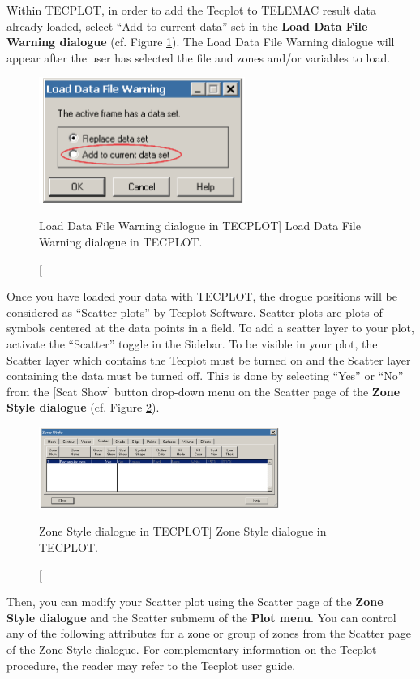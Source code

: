 Within TECPLOT, in order to add the Tecplot  to TELEMAC
result data already loaded, select ``Add to current data'' set in the
\textbf{Load Data File Warning dialogue} (cf. Figure \ref{fig:load_data}). The
Load Data File Warning dialogue will appear after the user has selected the
file and zones and/or variables to load.

\begin{figure}[H]%
\begin{center}
%
  \includegraphics[width=0.6\textwidth]{./graphics/load_data}
%
\end{center}
\caption
[Load Data File Warning dialogue in TECPLOT]
{Load Data File Warning dialogue in TECPLOT.}
\label{fig:load_data}
\end{figure}

Once you have loaded your data with TECPLOT, the drogue positions will be
considered as ``Scatter plots'' by Tecplot Software. Scatter plots are plots of
symbols centered at the data points in a field. To add a scatter layer to your
plot, activate the ``Scatter'' toggle in the Sidebar. To be visible in your
plot, the Scatter layer which contains the Tecplot  must be turned on and the Scatter layer containing the  data must be turned off. This is done by selecting ``Yes'' or ``No'' from
the [Scat Show] button drop-down menu on the Scatter page of the \textbf{Zone
Style dialogue} (cf. Figure \ref{fig:zone_style}).

\begin{figure}[H]%
\begin{center}
%
  \includegraphics[width=0.7\textwidth]{./graphics/zone_style}
%
\end{center}
\caption
[Zone Style dialogue in TECPLOT]
{Zone Style dialogue in TECPLOT.}
\label{fig:zone_style}
\end{figure}

Then, you can modify your Scatter plot using the Scatter page of the
\textbf{Zone Style dialogue} and the Scatter submenu of the \textbf{Plot menu}.
You can control any of the following attributes for a zone or group of zones
from the Scatter page of the Zone Style dialogue. For complementary information
on the Tecplot procedure, the reader may refer to the Tecplot user guide.
